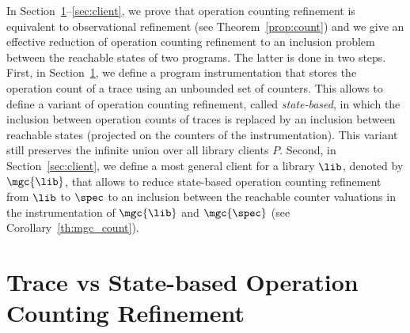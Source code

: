 In Section~\ref{sec:state}--\ref{sec:client}, we prove that operation counting refinement is equivalent to observational refinement (see Theorem~\ref{prop:count}) and we give an effective reduction of operation counting refinement to an inclusion problem between the reachable states of two programs. %
The latter is done in two steps. First, in Section~\ref{sec:state}, we define a program instrumentation that stores the operation count of a trace using an unbounded set of counters. This allows to define a variant of operation counting refinement, called \emph{state-based}, in which the inclusion between operation counts of traces is replaced by an inclusion between reachable states (projected on the counters of the instrumentation). This variant still preserves the infinite union over all library clients $P$. Second, in Section~\ref{sec:client}, we define a most general client for a library $\lib$, denoted by $\mgc{\lib}$, that allows to reduce state-based operation counting refinement from $\lib$ to $\spec$ to an inclusion between the reachable counter valuations in the instrumentation of $\mgc{\lib}$ and \resp $\mgc{\spec}$ (see Corollary~\ref{th:mgc_count}).


\section{Trace vs State-based Operation Counting Refinement}\label{sec:state}

